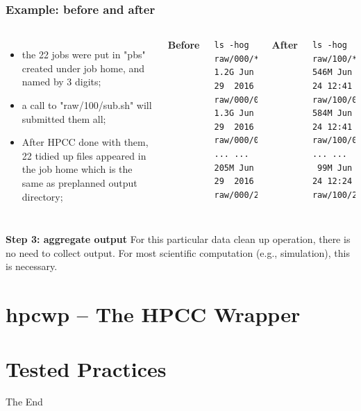 \documentclass{beamer}
\begin{document}
\begin{frame}[fragile]
\frametitle{Example: before and after}
\begin{columns}[c] %

\begin{itemize}
\item the 22 jobs were put in "pbs" created under job home, and named by 3 digits;
\item a call to "raw/100/sub.sh" will submitted them all;
\item After HPCC done with them, 22 tidied up files appeared in the job home which is the same as preplanned output directory; 

\end{itemize}


\textbf{Before}
\begin{lstlisting}[numbers=none]
ls -hog raw/000/*.vcf.gz
1.2G Jun 29  2016 raw/000/01.vcf.gz
1.3G Jun 29  2016 raw/000/02.vcf.gz
... ...
205M Jun 29  2016 raw/000/22.vcf.gz
\end{lstlisting} 

\textbf{After}
\begin{lstlisting}[numbers=none]
ls -hog raw/100/*.vcf.gz
546M Jun 24 12:41 raw/100/01.vcf.gz
584M Jun 24 12:41 raw/100/02.vcf.gz
... ...
 99M Jun 24 12:24 raw/100/22.vcf.gz
\end{lstlisting}
\end{columns}
\end{frame}


\begin{frame}
\textbf{Step 3: aggregate output}
For this particular data clean up operation, there is no need to collect output. For most scientific
computation (e.g., simulation), this is necessary.
\end{frame}

\section{hpcwp -- The HPCC Wrapper}


\section{Tested Practices}

\begin{frame}
\Huge{\centerline{The End}}
\end{frame}

\end{document}
